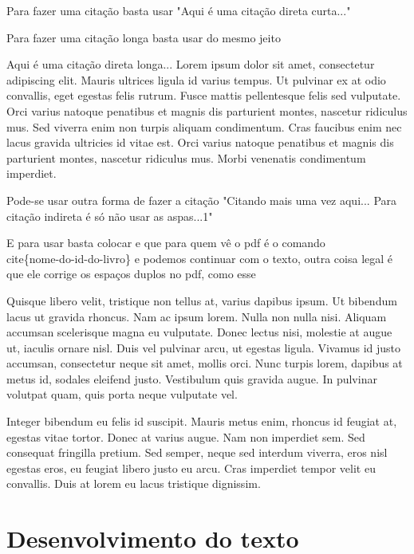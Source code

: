 \documentclass[
	12pt,				%
	oneside,			%
	a4paper,			%
	chapter=TITLE,		%
	english,			%
	brazil,				%
	]{custom-unisagrado}
\begin{document}
Para fazer uma citação basta usar \cite{citaUm} "Aqui é uma citação direta curta..."

Para fazer uma citação longa basta usar do mesmo jeito \cite{citaUm} 
\begin{citacao} Aqui é uma citação direta longa... Lorem ipsum dolor sit amet, consectetur adipiscing elit. Mauris ultrices ligula id varius tempus. Ut pulvinar ex at odio convallis, eget egestas felis rutrum. Fusce mattis pellentesque felis sed vulputate. Orci varius natoque penatibus et magnis dis parturient montes, nascetur ridiculus mus. Sed viverra enim non turpis aliquam condimentum. Cras faucibus enim nec lacus gravida ultricies id vitae est. Orci varius natoque penatibus et magnis dis parturient montes, nascetur ridiculus mus. Morbi venenatis condimentum imperdiet.
\end{citacao}

Pode-se usar outra forma de fazer a citação  "Citando mais uma vez aqui... Para citação indireta é só não usar as aspas...1"

E para usar basta colocar \cite{nome-do-id-do-livro} e que para quem vê o pdf é o comando {\\cite\{nome-do-id-do-livro\}} e podemos continuar com o texto, outra coisa legal é que ele corrige os espaços duplos no pdf,     como esse




Quisque libero velit, tristique non tellus at, varius dapibus ipsum. Ut bibendum lacus ut gravida rhoncus. Nam ac ipsum lorem. Nulla non nulla nisi. Aliquam accumsan scelerisque magna eu vulputate. Donec lectus nisi, molestie at augue ut, iaculis ornare nisl. Duis vel pulvinar arcu, ut egestas ligula. Vivamus id justo accumsan, consectetur neque sit amet, mollis orci. Nunc turpis lorem, dapibus at metus id, sodales eleifend justo. Vestibulum quis gravida augue. In pulvinar volutpat quam, quis porta neque vulputate vel.

Integer bibendum eu felis id suscipit. Mauris metus enim, rhoncus id feugiat at, egestas vitae tortor. Donec at varius augue. Nam non imperdiet sem. Sed consequat fringilla pretium. Sed semper, neque sed interdum viverra, eros nisl egestas eros, eu feugiat libero justo eu arcu. Cras imperdiet tempor velit eu convallis. Duis at lorem eu lacus tristique dignissim.

\chapter{Desenvolvimento do texto}
\end{document}
